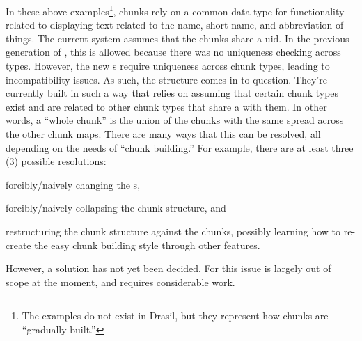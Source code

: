 In these above examples\footnote{The examples do not exist in Drasil, but they
represent how chunks are ``gradually built.''}, chunks rely on a common data
type for functionality related to displaying text related to the name, short
name, and abbreviation of things. The current system assumes that the chunks
share a \acs{uid}. In the previous generation of \ChunkDB{}, this is allowed
because there was no \UID{} uniqueness checking across types. However, the new
\ChunkDB{}s require \UID{} uniqueness across chunk types, leading to
incompatibility issues. As such, the structure comes in to question. They're
currently built in such a way that relies on assuming that certain chunk types
exist and are related to other chunk types that share a \UID{} with them. In
other words, a ``whole chunk'' is the union of the chunks with the same \UID{}
spread across the other chunk maps. There are many ways that this can be
resolved, all depending on the needs of ``chunk building.'' For example, there
are at least three (3) possible resolutions: 
\begin{inparaenum}[(i)]
      
      \item forcibly/naively changing the \UID{}s, 

      \item forcibly/naively collapsing the chunk structure, and 
      
      \item restructuring the chunk structure against the chunks, possibly
            learning how to re-create the easy chunk building style through
            other features.

\end{inparaenum}
However, a solution has not yet been decided. For this issue is largely out of
scope at the moment, and requires considerable work. 
